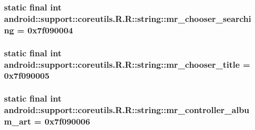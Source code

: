 \hypertarget{classandroid_1_1support_1_1coreutils_1_1_r_1_1string_8957953fee94a29b798f12e9c7d15834}{
\subsubsection[{mr\_\-chooser\_\-searching}]{\setlength{\rightskip}{0pt plus 5cm}static final int android::support::coreutils.R.R::string::mr\_\-chooser\_\-searching = 0x7f090004}}
\label{classandroid_1_1support_1_1coreutils_1_1_r_1_1string_8957953fee94a29b798f12e9c7d15834}


\hypertarget{classandroid_1_1support_1_1coreutils_1_1_r_1_1string_ac8b9c33a8f118465a45c21c9e1e0d03}{
\subsubsection[{mr\_\-chooser\_\-title}]{\setlength{\rightskip}{0pt plus 5cm}static final int android::support::coreutils.R.R::string::mr\_\-chooser\_\-title = 0x7f090005}}
\label{classandroid_1_1support_1_1coreutils_1_1_r_1_1string_ac8b9c33a8f118465a45c21c9e1e0d03}


\hypertarget{classandroid_1_1support_1_1coreutils_1_1_r_1_1string_bd5c33d14326b44e8bd8739909a14c34}{
\subsubsection[{mr\_\-controller\_\-album\_\-art}]{\setlength{\rightskip}{0pt plus 5cm}static final int android::support::coreutils.R.R::string::mr\_\-controller\_\-album\_\-art = 0x7f090006}}
\label{classandroid_1_1support_1_1coreutils_1_1_r_1_1string_bd5c33d14326b44e8bd8739909a14c34}


